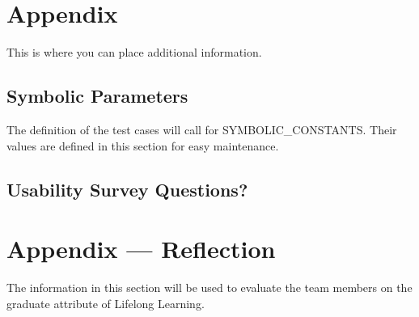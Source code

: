 \documentclass[12pt, titlepage]{article}
\begin{document}
\newpage

\section{Appendix}

This is where you can place additional information.

\subsection{Symbolic Parameters}

The definition of the test cases will call for SYMBOLIC\_CONSTANTS.
Their values are defined in this section for easy maintenance.

\subsection{Usability Survey Questions?}


\newpage{}
\section*{Appendix --- Reflection}


The information in this section will be used to evaluate the team members on the
graduate attribute of Lifelong Learning.


\end{document}
